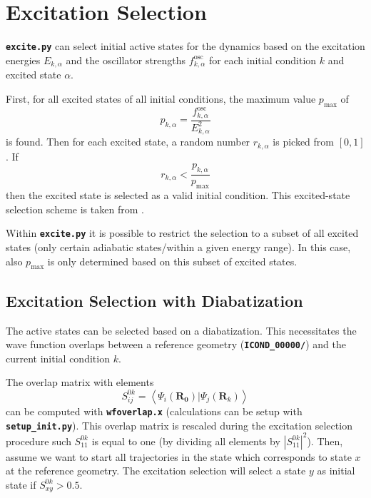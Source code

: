 \documentclass[a4paper,10pt,DIV=15,openany,twoside=false]{scrbook}
\newcommand{\ttt}[1]{\textbf{\texttt{#1}}}
\newcommand{\VEC}[1]{\ensuremath{\mathbf{#1}}}
\begin{document}

\section{Excitation Selection}\label{met:exc_selection}

\ttt{excite.py} can select initial active states for the dynamics based on the excitation energies $E_{k,\alpha}$ and the oscillator strengths $f^{\text{osc}}_{k,\alpha}$ for each initial condition $k$ and excited state $\alpha$. 

First, for all excited states of all initial conditions, the maximum value $p_{\text{max}}$ of 
\begin{equation}
  p_{k,\alpha}=\frac{f^{\text{osc}}_{k,\alpha}}{E_{k,\alpha}^2} \label{eq:exc_prob}
\end{equation}
is found. Then for each excited state, a random number $r_{k,\alpha}$ is picked from $[0,1]$. If
\begin{equation}
  r_{k,\alpha}<\frac{p_{k,\alpha}}{p_{\text{max}}}
\end{equation}
then the excited state is selected as a valid initial condition. This excited-state selection scheme is taken from \cite{Barbatti2011}.

Within \ttt{excite.py} it is possible to restrict the selection to a subset of all excited states (only certain adiabatic states/within a given energy range). In this case, also $p_{\text{max}}$ is only determined based on this subset of excited states.

\subsection{Excitation Selection with Diabatization}\label{met:exc_diabatic}

The active states can be selected based on a diabatization.
This necessitates the wave function overlaps between a reference geometry (\ttt{ICOND\_00000/}) and the current initial condition $k$.

The overlap matrix with elements
\begin{equation}
  S^{0k}_{ij}=\left\langle \Psi_i(\VEC{R_0})|\Psi_j(\VEC{R}_k)\right\rangle
\end{equation}
can be computed with \ttt{wfoverlap.x} (calculations can be setup with \ttt{setup\_init.py}).
This overlap matrix is rescaled during the excitation selection procedure such $S^{0k}_{11}$ is equal to one (by dividing all elements by $|S^{0k}_{11}|^2$).
Then, assume we want to start all trajectories in the state which corresponds to state $x$ at the reference geometry.
The excitation selection will select a state $y$ as initial state if $S^{0k}_{xy}>0.5$.
\end{document}
